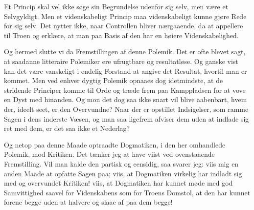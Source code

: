 \documentclass[12pt,a4paper]{book}
\newcommand{\opage}[1]{\marginnote{\footnotesize\textit{[#1]}}}
\begin{document}
Et Princip skal vel ikke søge sin Begrundelse udenfor sig
selv, men være et Selvgyldigt. Men et videnskabeligt Princip
maa videnskabeligt kunne gjøre Rede for sig selv. Det nytter
ikke, naar Controllen bliver nærgaaende, da at appellere til
Troen og erklære, at man paa Basis af den har en høiere
Videnskabelighed.

Og hermed slutte vi da Fremstillingen af denne Polemik.
Det er ofte blevet sagt, at saadanne litteraire Polemiker ere
ufrugtbare og resultatløse. Og ganske vist kan det være vanskeligt
i endelig Forstand at angive det Resultat, hvortil man
er kommet. Men ved enhver dygtig Polemik opnaaes dog idetmindste,
at de stridende Principer komme til Orde og træde
frem paa Kamppladsen for at vove en Dyst med hinanden. Og
mon det dog saa ikke snart vil blive aabenbart, hvem der,
ideelt seet, er den Overvundne? Naar der er opstillet Indsigelser,
som ramme Sagen i dens inderste Væsen, og man
saa ligefrem afviser dem uden at indlade sig ret med dem, er
det saa ikke et Nederlag?

\opage{36}\setcounter{footnote}{0}%
Og netop paa denne Maade optraadte Dogmatiken, i den
her omhandlede Polemik, mod Kritiken. Det tænker jeg at
have viist ved ovenstaaende Fremstilling. Vil man kalde den
partisk og eensidig, saa svarer jeg: viis mig en anden Maade
at opfatte Sagen paa; viis, at Dogmatiken virkelig har indladt
sig med og overvundet Kritiken! viis, at Dogmatiken har
kunnet møde med god Samvittighed saavel for Videnskabens
som for Troens Domstol, at den har kunnet forene begge
uden at halvere og slaae af paa dem begge!
\end{document}
